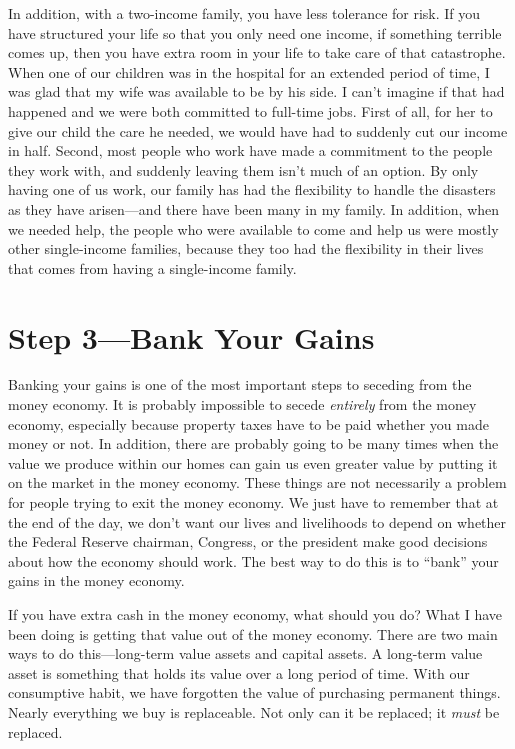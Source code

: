 \begin{infonote}
In addition, with a two-income family, you have less tolerance for risk.
If you have structured your life so that you only need one income, if
something terrible comes up, then you have extra room in your life to
take care of that catastrophe. When one of our children was in the
hospital for an extended period of time, I was glad that my wife was
available to be by his side. I can’t imagine if that had happened and
we were both committed to full-time jobs. First of all, for her to give
our child the care he needed, we would have had to suddenly cut our
income in half. Second, most people who work have made a commitment to
the people they work with, and suddenly leaving them isn’t much of an
option. By only having one of us work, our family has had the
flexibility to handle the disasters as they have arisen---and there have
been many in my family. In addition, when we needed help, the people
who were available to come and help us were mostly other single-income
families, because they too had the flexibility in their lives that
comes from having a single-income family.
\end{infonote}

\section{Step 3---Bank Your Gains}

Banking your gains is
one of the most important steps to seceding from the money economy. It
is probably impossible to secede \textit{entirely} from the money
economy, especially because property taxes have to be paid whether you
made money or not. In addition, there are probably going to be many
times when the value we produce within our homes can gain us even
greater value by putting it on the market in the money economy. These
things are not necessarily a problem for people trying to exit the
money economy. We just have to remember that at the end of the day, we
don’t want our lives and livelihoods to depend on whether the Federal
Reserve chairman, Congress, or the president make good decisions about
how the economy should work. The best way to do this is to ``bank'' your
gains in the money economy.

If you have extra cash in the money economy, what should you do?  What I
have been doing is getting that value out of the money economy. There
are two main ways to do this---long-term value assets and capital assets.
A long-term value asset is something that holds its value over a long
period of time. With our consumptive habit, we have forgotten the value
of purchasing permanent things. Nearly everything we buy is
replaceable. Not only can it be replaced; it \textit{must} be replaced.

